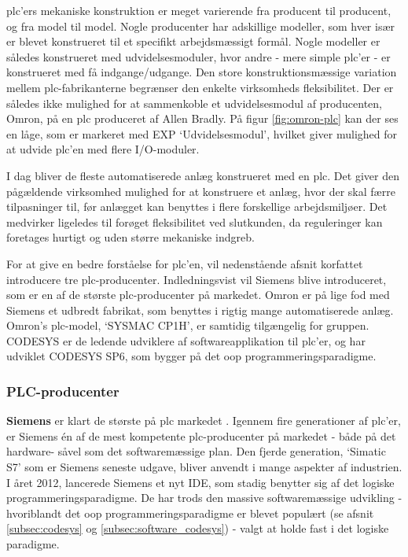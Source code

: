 
\noindent \gls{plc}'ers mekaniske konstruktion er meget varierende fra producent til producent, og fra model til model. Nogle producenter har adskillige modeller, som hver især er blevet konstrueret til et specifikt arbejdsmæssigt formål. Nogle modeller er således konstrueret med udvidelsesmoduler, hvor andre - mere simple \gls{plc}'er - er konstrueret med få indgange/udgange. 
Den store konstruktionsmæssige variation mellem \gls{plc}-fabrikanterne begrænser den enkelte virksomheds fleksibilitet. Der er således ikke mulighed for at sammenkoble et udvidelsesmodul af producenten, Omron, på en \gls{plc} produceret af Allen Bradly\cite{PLC-comb}. På figur \ref{fig:omron-plc} kan der ses en låge, som er markeret med EXP \enquote*{Udvidelsesmodul}, hvilket giver mulighed for at udvide \gls{plc}'en med flere I/O-moduler. 

I dag bliver de fleste automatiserede anlæg konstrueret med en \gls{plc}. Det giver den pågældende virksomhed mulighed for at konstruere et anlæg, hvor der skal færre tilpasninger til, før anlægget kan benyttes i flere forskellige arbejdsmiljøer. Det medvirker ligeledes til forøget fleksibilitet ved slutkunden, da reguleringer kan foretages hurtigt og uden større mekaniske indgreb.

\noindent For at give en bedre forståelse for \gls{plc}'en, vil nedenstående afsnit korfattet introducere tre \gls{plc}-producenter. Indledningsvist vil Siemens blive introduceret, som er en af de største \gls{plc}-producenter på markedet. Omron er på lige fod med Siemens et udbredt fabrikat, som benyttes i rigtig mange automatiserede anlæg. Omron's \gls{plc}-model, \enquote*{SYSMAC CP1H}, er samtidig tilgængelig for gruppen. CODESYS er de ledende udviklere af softwareapplikation til \gls{plc}'er, og har udviklet CODESYS SP6, som bygger på det \gls{oop} programmeringsparadigme.

\subsubsection*{PLC-producenter}
\label{subsec:siemens}
\noindent\textbf{Siemens} er klart de største på \gls{plc} markedet \cite{plc-marked-shares}. Igennem fire generationer af \gls{plc}'er, er Siemens én af de mest kompetente \gls{plc}-producenter på markedet - både på det hardware- såvel som det softwaremæssige plan. Den fjerde generation, \enquote*{Simatic S7} som er Siemens seneste udgave, bliver anvendt i mange aspekter af industrien. I året 2012, lancerede Siemens et nyt IDE, som stadig benytter sig af det logiske programmeringsparadigme. De har trods den massive softwaremæssige udvikling - hvoriblandt det \gls{oop} programmeringsparadigme er blevet populært (se afsnit \ref{subsec:codesys} og \ref{subsec:software_codesys}) - valgt at holde fast i det logiske paradigme. \\


